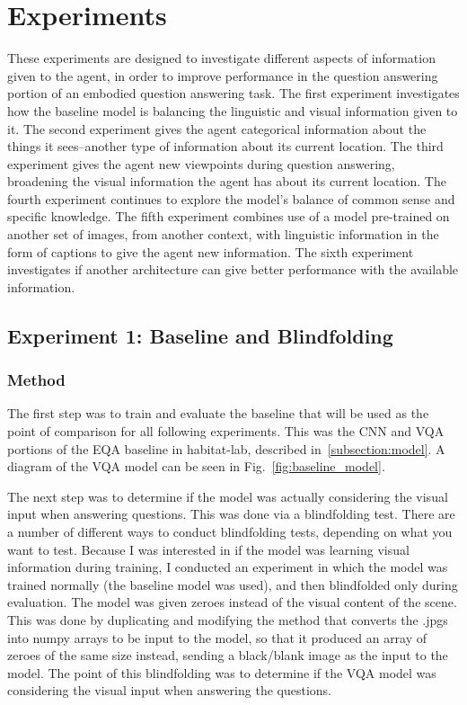 \chapter{Experiments}
These experiments are designed to investigate different aspects of information given to the agent, in order to improve performance in the question answering portion of an embodied question answering task. The first experiment investigates how the baseline model is balancing the linguistic and visual information given to it. The second experiment gives the agent categorical information about the things it sees--another type of information about its current location. The third experiment gives the agent new viewpoints during question answering, broadening the visual information the agent has about its current location. The fourth experiment continues to explore the model's balance of common sense and specific knowledge. The fifth experiment combines use of a model pre-trained on another set of images, from another context, with linguistic information in the form of captions to give the agent new information. The sixth experiment investigates if another architecture can give better performance with the available information. 

\section{Experiment 1: Baseline and Blindfolding}
\label{sec:exp_1}
\subsection{Method}
The first step was to train and evaluate the baseline that will be used as the point of comparison for all following experiments. This was the CNN and VQA portions of the EQA baseline in habitat-lab, described in~\ref{subsection:model}. A diagram of the VQA model can be seen in Fig.~\ref{fig:baseline_model}. 

The next step was to determine if the model was actually considering the visual input when answering questions. This was done via a blindfolding test. There are a number of different ways to conduct blindfolding tests, depending on what you want to test. Because I was interested in if the model was learning visual information during training, I conducted an experiment in which the model was trained normally (the baseline model was used), and then blindfolded only during evaluation. The model was given zeroes instead of the visual content of the scene. This was done by duplicating and modifying the method that converts the .jpgs into numpy arrays to be input to the model, so that it produced an array of zeroes of the same size instead, sending a black/blank image as the input to the model. The point of this blindfolding was to determine if the VQA model was considering the visual input when answering the questions. 

